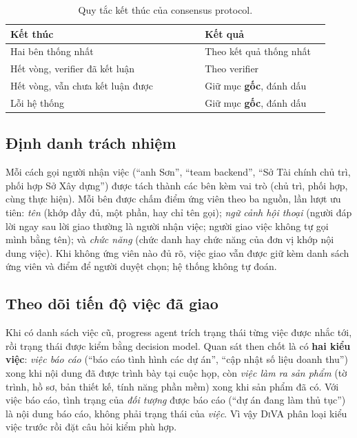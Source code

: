 \documentclass[11pt]{article}
\newcommand{\diva}{\textsc{DiVA}}
\begin{document}
\begin{table}[t]
\centering\small
\begin{tabular}{@{}L{0.56\linewidth}L{0.36\linewidth}@{}}
\toprule
\textbf{Kết thúc} & \textbf{Kết quả} \\
\midrule
Hai bên thống nhất & Theo kết quả thống nhất \\
Hết vòng, verifier đã kết luận & Theo verifier \\
Hết vòng, vẫn chưa kết luận được & Giữ mục \textbf{gốc}, đánh dấu \\
Lỗi hệ thống & Giữ mục \textbf{gốc}, đánh dấu \\
\bottomrule
\end{tabular}
\caption{Quy tắc kết thúc của consensus protocol.}
\label{tab:termination}
\end{table}

\subsection{Định danh trách nhiệm}

Mỗi cách gọi người nhận việc (``anh Sơn'', ``team backend'', ``Sở Tài chính chủ trì, phối hợp Sở Xây
dựng'') được tách thành các bên kèm vai trò (chủ trì, phối hợp, cùng thực hiện). Mỗi bên được chấm điểm
ứng viên theo ba nguồn, lần lượt ưu tiên: \emph{tên} (khớp đầy đủ, một phần, hay chỉ tên gọi); \emph{ngữ
cảnh hội thoại} (người đáp lời ngay sau lời giao thường là người nhận việc; người giao việc không tự gọi
mình bằng tên); và \emph{chức năng} (chức danh hay chức năng của đơn vị khớp nội dung việc). Khi không ứng
viên nào đủ rõ, việc giao vẫn được giữ kèm danh sách ứng viên và điểm để người duyệt chọn; hệ thống không
tự đoán.

\subsection{Theo dõi tiến độ việc đã giao}
\label{sec:progress}

Khi có danh sách việc cũ, progress agent trích trạng thái từng việc được nhắc tới, rồi trạng thái được
kiểm bằng decision model. Quan sát then chốt là có \textbf{hai kiểu việc}: \emph{việc báo cáo} (``báo cáo
tình hình các dự án'', ``cập nhật số liệu doanh thu'') xong khi nội dung đã được trình bày tại cuộc họp,
còn \emph{việc làm ra sản phẩm} (tờ trình, hồ sơ, bản thiết kế, tính năng phần mềm) xong khi sản phẩm đã
có. Với việc báo cáo, tình trạng của \emph{đối tượng} được báo cáo (``dự án đang làm thủ tục'') là nội
dung báo cáo, không phải trạng thái của \emph{việc}. Vì vậy \diva{} phân loại kiểu việc trước rồi đặt câu
hỏi kiểm phù hợp.
\end{document}
